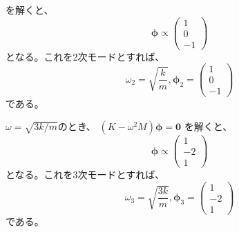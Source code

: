 \documentclass[a4paper]{jsarticle}
\begin{document}
を解くと、
\begin{equation}
  \boldsymbol{\phi} \propto
  \begin{pmatrix}
    1 \\ 0 \\ -1
  \end{pmatrix}
\end{equation}
となる。これを2次モードとすれば、
\begin{equation}
  \omega_2 = \sqrt{\frac{k}{m}}, \boldsymbol{\phi}_2 =
  \begin{pmatrix}
    1 \\ 0 \\ -1
  \end{pmatrix}
\end{equation}
である。\par
$\omega = \sqrt{3k/m}$のとき、
$(K -\omega^2 M) \boldsymbol{\phi} = \boldsymbol{0}$
を解くと、
\begin{equation}
  \boldsymbol{\phi} \propto
  \begin{pmatrix}
    1 \\ -2 \\ 1
  \end{pmatrix}
\end{equation}
となる。これを3次モードとすれば、
\begin{equation}
  \omega_3 = \sqrt{\frac{3k}{m}}, \boldsymbol{\phi}_3 =
  \begin{pmatrix}
    1 \\ -2 \\ 1
  \end{pmatrix}
\end{equation}
である。\par
\end{document}
